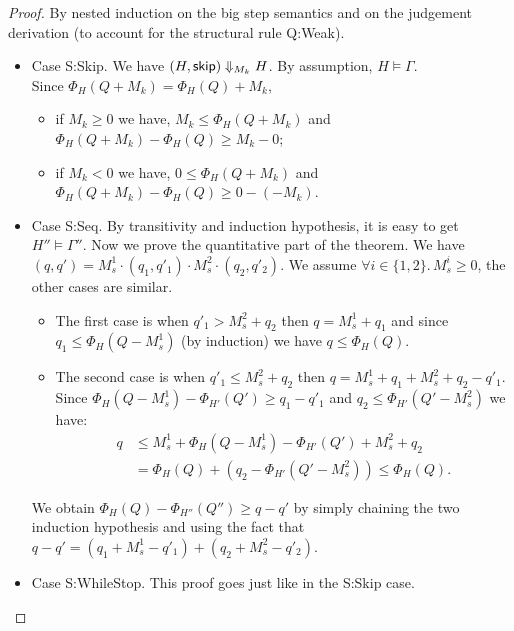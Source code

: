 \documentclass[nocopyrightspace,preprint]{sigplanconf}
\begin{document}
\begin{proof} By nested induction on the big step semantics and on the
judgement derivation (to account for the structural rule {\sc Q:Weak}).

\begin{itemize}

\item Case {\sc S:Skip}.
  We have $(H, \mathsf{skip}) \Downarrow_{M_k} H$.
  By assumption, $H \models \Gamma$. \\
  Since $\Phi_H(Q + M_k) = \Phi_H(Q) + M_k$,
  \begin{itemize}[topsep=0pt]
  \item
    if $M_k \ge 0$ we have,
      $M_k \le \Phi_H(Q + M_k)$ and
      $\Phi_H(Q + M_k) - \Phi_H(Q) \ge M_k - 0$;
  \item
    if $M_k < 0$ we have,
      $0 \le \Phi_H(Q + M_k)$ and
      $\Phi_H(Q + M_k) - \Phi_H(Q) \ge 0 - (-M_k)$.
  \end{itemize}

\item Case {\sc S:Seq}.
  By transitivity and induction hypothesis, it is
  easy to get $H'' \models \Gamma''$.  Now we prove
  the quantitative part of the theorem.  We have
  $(q, q') = M_s^1 \cdot (q_1, q'_1) \cdot M_s^2 \cdot (q_2, q'_2)$.
  We assume $\forall i \in \{1, 2\}.\, M_s^i \ge 0$, the other cases
  are similar.
  \begin{itemize}[topsep=0pt]
  \item
    The first case is when $q'_1 > M_s^2 + q_2$ then $q = M_s^1 + q_1$
    and since $q_1 \le \Phi_H(Q - M_s^1)$ (by induction) we have
    $q \le \Phi_H(Q)$.
  \item
    The second case is when $q'_1 \le M_s^2 + q_2$ then $q = M_s^1 + q_1 + M_s^2 + q_2 - q'_1$. \\
    Since $\Phi_H(Q - M_s^1) - \Phi_{H'}(Q') \ge q_1 - q'_1$
    and $q_2 \le \Phi_{H'}(Q' - M_s^2)$ we have:
    \begin{align*}
    q &\le M_s^1 + \Phi_H(Q - M_s^1) - \Phi_{H'}(Q') + M_s^2 + q_2 \\
      &= \Phi_H(Q) + (q_2 - \Phi_{H'}(Q' - M_s^2)) \le \Phi_H(Q).
   \end{align*}
  \end{itemize}
  We obtain $\Phi_H(Q) - \Phi_{H''}(Q'') \ge q - q'$ by simply chaining
  the two induction hypothesis and using the fact that $q - q' =
  (q_1 + M_s^1 - q'_1) + (q_2 + M_s^2 - q'_2)$.

\item Case {\sc S:WhileStop}.
  This proof goes just like in the {\sc S:Skip} case.


\end{itemize}
\end{proof}
\end{document}
